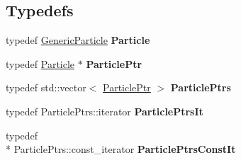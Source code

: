 \subsection*{Typedefs}
\begin{DoxyCompactItemize}
\item 
\hypertarget{namespace_h_a_l_a8e90b3570f12960529bfa31c5f4975ee}{typedef \hyperlink{class_h_a_l_1_1_generic_particle}{Generic\+Particle} {\bfseries Particle}}\label{namespace_h_a_l_a8e90b3570f12960529bfa31c5f4975ee}

\item 
\hypertarget{namespace_h_a_l_af40898da7d6a44a415de9012b3764210}{typedef \hyperlink{class_h_a_l_1_1_generic_particle}{Particle} $\ast$ {\bfseries Particle\+Ptr}}\label{namespace_h_a_l_af40898da7d6a44a415de9012b3764210}

\item 
\hypertarget{namespace_h_a_l_a775ef811d38552a0ee603d80b77da9ab}{typedef std\+::vector$<$ \hyperlink{class_h_a_l_1_1_generic_particle}{Particle\+Ptr} $>$ {\bfseries Particle\+Ptrs}}\label{namespace_h_a_l_a775ef811d38552a0ee603d80b77da9ab}

\item 
\hypertarget{namespace_h_a_l_acea038eb6c89dbf396060ed07b79059e}{typedef Particle\+Ptrs\+::iterator {\bfseries Particle\+Ptrs\+It}}\label{namespace_h_a_l_acea038eb6c89dbf396060ed07b79059e}

\item 
\hypertarget{namespace_h_a_l_a86a0d42ec6c4857f7f83138fe1dff490}{typedef \\*
Particle\+Ptrs\+::const\+\_\+iterator {\bfseries Particle\+Ptrs\+Const\+It}}\label{namespace_h_a_l_a86a0d42ec6c4857f7f83138fe1dff490}

\end{DoxyCompactItemize}
